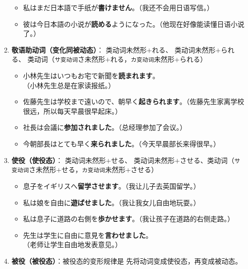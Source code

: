 \begin{enumerate}[A]
\begin{itemize}
        \item {\jp 私はまだ日本語で手纸が{\bfseries 書けません}。}（我还不会用日语写信。）
        \item {\jp 彼は今日本語の小说が{\bfseries 読める}ようになった。}（他现在好像能读懂日语小说了。）
    \end{itemize}
        \vspace{0.2in}
    \item {\bfseries 敬语助动词（变化同被动态）}：{\uppercase\expandafter{} 类动词未然形$+$れる、\uppercase\expandafter{} 类动词未然形$+$られる、\uppercase\expandafter{} 类动词（{\texttt{サ变动词}}さ未然形$+$れる，\texttt{カ变动词}未然形+られる）}
    \begin{itemize}
        \item {\jp 小林先生はいつもお宅で新聞を{\bfseries 読まれます}。}（小林先生总是在家读报纸。）
        \item {\jp 佐藤先生は学校まで遠いので、朝早く{\bfseries 起きられます}。}（佐藤先生家离学校很远，所以每天早晨很早起床。）
        \item {\jp 社長は会議に{\bfseries 参加されました}。}（总经理参加了会议。）
        \item {\jp 今朝部長はとても早く{\bfseries 来られました}。}（今天早晨部长来得很早。）
    \end{itemize}        
    \vspace{0.2in}
    \item {\bfseries 使役（使役态）}：{\uppercase\expandafter{} 类动词未然形$+$せる、\uppercase\expandafter{} 类动词未然形$+$させる、\uppercase\expandafter{}类动词（{\texttt{サ变动词}}さ未然形$+$せる，\texttt{カ变动词}未然形+させる）}
    \begin{itemize}
        \item {\jp 息子をイギリスへ{\bfseries 留学させます}。}（我让儿子去英国留学。）
        \item {\jp 私は娘を自由に{\bfseries 遊ばせました}。}（我让我女儿自由地玩耍。）
        \item {\jp 私は息子に道路の右側を{\bfseries 歩かせます}。}（我让孩子在道路的右侧走路。）
        \item {\jp 先生は学生に自由に意見を{\bfseries 言わせました}。}（老师让学生自由地发表意见。）
    \end{itemize}
    
    \vspace{0.2in}
    \item {\bfseries 被役（被役态）}：被役态的变形规律是 先将动词变成使役态，再变成被动态。
    

\end{enumerate}
